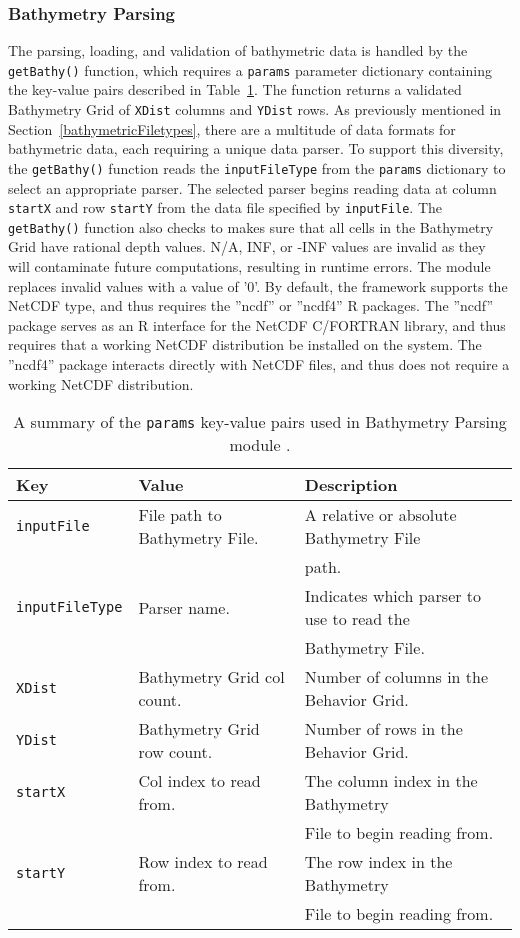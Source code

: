 \subsubsection{Bathymetry Parsing}
The parsing, loading, and validation of bathymetric data is handled by the \texttt{getBathy()} function, which requires a \texttt{params} parameter dictionary containing the key-value pairs described in Table~\ref{bathyParams}.  The function returns a validated Bathymetry Grid of \texttt{XDist} columns and \texttt{YDist} rows.  As previously mentioned in Section~\ref{bathymetricFiletypes}, there are a multitude of data formats for bathymetric data, each requiring a unique data parser.  To support this diversity, the \texttt{getBathy()} function reads the \texttt{inputFileType} from the \texttt{params} dictionary to select an appropriate parser.  The selected parser begins reading data at column \texttt{startX} and row \texttt{startY} from the data file specified by \texttt{inputFile}.  The \texttt{getBathy()} function also checks to makes sure that all cells in the Bathymetry Grid have rational depth values.  N/A, INF, or -INF values are invalid as they will contaminate future computations, resulting in runtime errors.  The module replaces invalid values with a value of '0'.  By default, the framework supports the NetCDF type, and thus requires the ''ncdf'' or ''ncdf4'' R packages.  The ''ncdf'' package serves as an R interface for the NetCDF C/FORTRAN library, and thus requires that a working NetCDF distribution be installed on the system.  The ''ncdf4'' package interacts directly with NetCDF files, and thus does not require a working NetCDF distribution.  

\begin{table}[ht]
	\begin{tabular}{l l l}
		Key						&	Value 								&	Description\\
		\hline
		\texttt{inputFile}		& 	File path to Bathymetry File.		&	A relative or absolute Bathymetry File\\
								&										&	path.\\
		\texttt{inputFileType}	& 	Parser name.						&	Indicates which parser to use to read the \\
								&										&	Bathymetry File.\\
		\texttt{XDist}			&	Bathymetry Grid col count.			&	Number of columns in the Behavior Grid.\\
		\texttt{YDist}			&	Bathymetry Grid row count.			&	Number of rows in the Behavior 	Grid.\\		
		\texttt{startX}			& 	Col index to read from. 			& 	The column index in the Bathymetry\\
								&										&   File to	begin reading from.\\
		\texttt{startY}			& 	Row index to read from.				&	The row index in the Bathymetry\\
								&										&	File to begin reading from.\\
	\end{tabular}
	\caption{A summary of the \texttt{params} key-value pairs used in Bathymetry Parsing module .
		\label{bathyParams}}
\end{table}

